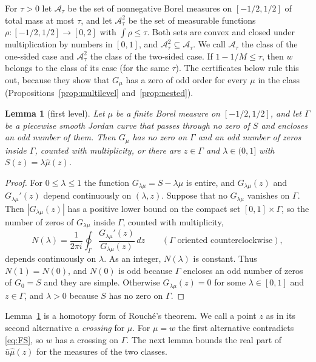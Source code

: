 \documentclass[11pt]{amsart}
\newtheorem{lemma}[theorem]{Lemma}
\theoremstyle{definition}
\theoremstyle{remark}
\numberwithin{equation}{section}
\begin{document}
For $\tau>0$ let $\mathcal A_\tau$ be the set of nonnegative Borel measures on $[-1/2,1/2]$ of total mass at most $\tau$, and let $\mathcal A^2_\tau$ be the set of measurable functions $\rho\colon[-1/2,1/2]\to[0,2]$ with $\int\rho\le\tau$. Both sets are convex and closed under multiplication by numbers in $[0,1]$, and $\mathcal A^2_\tau\subseteq\mathcal A_\tau$. We call $\mathcal A_\tau$ the class of the one-sided case and $\mathcal A^2_\tau$ the class of the two-sided case. If $1-1/M\le\tau$, then $w$ belongs to the class of its case (for the same $\tau$). The certificates below rule this out, because they show that $G_\mu$ has a zero of odd order for every $\mu$ in the class (Propositions~\ref{prop:multilevel} and~\ref{prop:nested}).

\begin{lemma}[first level]\label{lem:crossing}
Let $\mu$ be a finite Borel measure on $[-1/2,1/2]$, and let $\Gamma$ be a piecewise smooth Jordan curve that passes through no zero of $S$ and encloses an odd number of them. Then $G_\mu$ has no zero on $\Gamma$ and an odd number of zeros inside $\Gamma$, counted with multiplicity, or there are $z\in\Gamma$ and $\lambda\in(0,1]$ with $S(z)=\lambda\hat\mu(z)$.
\end{lemma}

\begin{proof}
For $0\le\lambda\le1$ the function $G_{\lambda\mu}=S-\lambda\hat\mu$ is entire, and $G_{\lambda\mu}(z)$ and $G_{\lambda\mu}'(z)$ depend continuously on $(\lambda,z)$. Suppose that no $G_{\lambda\mu}$ vanishes on $\Gamma$. Then $|G_{\lambda\mu}(z)|$ has a positive lower bound on the compact set $[0,1]\times\Gamma$, so the number of zeros of $G_{\lambda\mu}$ inside $\Gamma$, counted with multiplicity,
\[
N(\lambda)=\frac1{2\pi i}\oint_\Gamma\frac{G_{\lambda\mu}'(z)}{G_{\lambda\mu}(z)}\,dz\qquad(\Gamma\text{ oriented counterclockwise}),
\]
depends continuously on $\lambda$. As an integer, $N(\lambda)$ is constant. Thus $N(1)=N(0)$, and $N(0)$ is odd because $\Gamma$ encloses an odd number of zeros of $G_0=S$ and they are simple. Otherwise $G_{\lambda\mu}(z)=0$ for some $\lambda\in[0,1]$ and $z\in\Gamma$, and $\lambda>0$ because $S$ has no zero on $\Gamma$.
\end{proof}

Lemma~\ref{lem:crossing} is a homotopy form of Rouch\'e's theorem. We call a point $z$ as in its second alternative a \emph{crossing} for $\mu$. For $\mu=w$ the first alternative contradicts \eqref{eq:FS}, so $w$ has a crossing on $\Gamma$. The next lemma bounds the real part of $\bar u\hat\mu(z)$ for the measures of the two classes.
\end{document}
